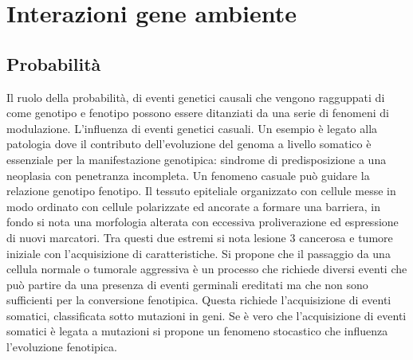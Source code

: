 \chapter{Interazioni gene ambiente}
\section{Probabilit\`a}
Il ruolo della probabilit\`a, di eventi genetici causali che vengono ragguppati di come genotipo e fenotipo possono essere ditanziati da una serie di fenomeni di modulazione. L'influenza
di eventi genetici casuali. Un esempio \`e legato alla patologia dove il contributo dell'evoluzione del genoma a livello somatico \`e essenziale per la manifestazione genotipica: 
sindrome di predisposizione a una neoplasia con penetranza incompleta. Un fenomeno casuale pu\`o guidare la relazione genotipo fenotipo. Il tessuto epiteliale organizzato con cellule
messe in modo ordinato con cellule polarizzate ed ancorate a formare una barriera, in fondo si nota una morfologia alterata con eccessiva proliverazione ed espressione di nuovi 
marcatori. Tra questi due estremi si nota lesione $3$ cancerosa e tumore iniziale con l'acquisizione di caratteristiche. Si propone che il passaggio da una cellula normale o tumorale
aggressiva \`e un processo che richiede diversi eventi che pu\`o partire da una presenza di eventi germinali ereditati ma che non sono sufficienti per la conversione fenotipica. 
Questa richiede l'acquisizione di eventi somatici, classificata sotto mutazioni in geni. Se \`e vero che l'acquisizione di eventi somatici \`e legata a mutazioni si propone un fenomeno
stocastico che influenza l'evoluzione fenotipica. 
